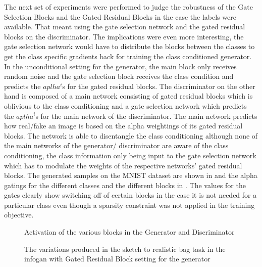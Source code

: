The next set of experiments were performed to judge the robustness of the Gate Selection Blocks and the Gated Residual Blocks in the case the labels were available. That meant using the gate selection network and the gated residual blocks on the discriminator. The implications were even more interesting, the gate selection network would have to distribute the blocks between the classes to get the class specific gradients back for training the class conditioned generator. In the unconditional setting for the generator, the main block only receives random noise and the gate selection block receives the class condition and predicts the $aplha^i$s for the gated residual blocks. The discriminator on the other hand is composed of a main network consisting of gated residual blocks which is oblivious to the class conditioning and a gate selection network which predicts the $aplha^i$s for the main network of the discriminator. The main network predicts how real/fake an image is based on the alpha weightings of its gated residual blocks. The network is able to disentangle the class conditioning although none of the main networks of the generator/ discriminator are aware of the class conditioning, the class information only being input to the gate selection network which has to modulate the weights of the respective networks' gated residual blocks. The generated samples on the MNIST dataset are shown in  and the alpha gatings for the different classes and the different blocks in . The values for the gates clearly show switching off of certain blocks in the case it is not needed for a particular class even though a sparsity constraint was not applied in the training objective.


\begin{figure}%
    \centering
    \caption{Activation of the various blocks in the Generator and Discriminator}
    \label{fig:mnist_act}
    \vspace{-3mm}
\end{figure}






\begin{figure*}[t]%
    \centering
    \caption{The variations produced in the sketch to realistic bag task in the infogan with Gated Residual Block setting for the generator }
    \label{fig:infogan_bags}
    \vspace{-3mm}
\end{figure*}




